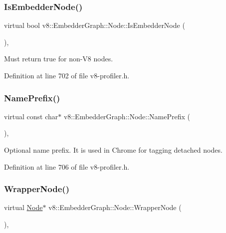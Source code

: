 \subsubsection{\texorpdfstring{Is\+Embedder\+Node()}{IsEmbedderNode()}}
{\footnotesize\ttfamily virtual bool v8\+::\+Embedder\+Graph\+::\+Node\+::\+Is\+Embedder\+Node (\begin{DoxyParamCaption}{ }\end{DoxyParamCaption})\hspace{0.3cm}{\ttfamily [inline]}, {\ttfamily [virtual]}}

Must return true for non-\/\+V8 nodes. 

Definition at line 702 of file v8-\/profiler.\+h.

\mbox{\label{classv8_1_1EmbedderGraph_1_1Node_a2c4c64b2c3eab48dcdc587aec8734ee8}} 
\subsubsection{\texorpdfstring{Name\+Prefix()}{NamePrefix()}}
{\footnotesize\ttfamily virtual const char$\ast$ v8\+::\+Embedder\+Graph\+::\+Node\+::\+Name\+Prefix (\begin{DoxyParamCaption}{ }\end{DoxyParamCaption})\hspace{0.3cm}{\ttfamily [inline]}, {\ttfamily [virtual]}}

Optional name prefix. It is used in Chrome for tagging detached nodes. 

Definition at line 706 of file v8-\/profiler.\+h.

\mbox{\label{classv8_1_1EmbedderGraph_1_1Node_acfe58e3b4db90c2ebbfcee5f81415181}} 
\subsubsection{\texorpdfstring{Wrapper\+Node()}{WrapperNode()}}
{\footnotesize\ttfamily virtual \mbox{\hyperlink{classv8_1_1EmbedderGraph_1_1Node}{Node}}$\ast$ v8\+::\+Embedder\+Graph\+::\+Node\+::\+Wrapper\+Node (\begin{DoxyParamCaption}{ }\end{DoxyParamCaption})\hspace{0.3cm}{\ttfamily [inline]}, {\ttfamily [virtual]}}

